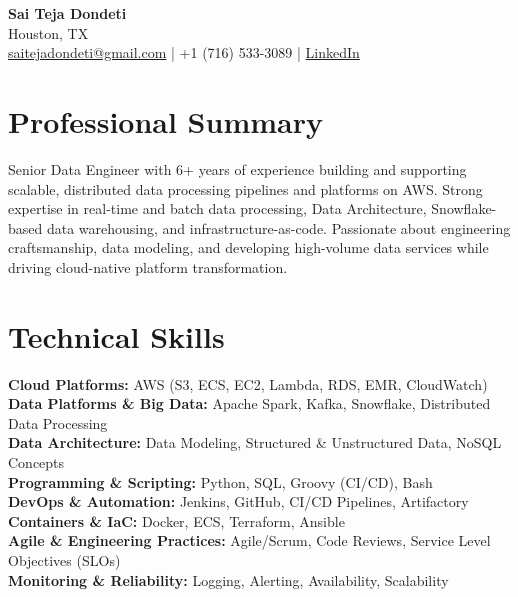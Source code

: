 \documentclass[10pt]{article}
\begin{document}
\begin{center}
    {\LARGE \textbf{Sai Teja Dondeti}} \\
    \vspace{2pt}
    Houston, TX \\
    \href{mailto:saitejadondeti@gmail.com}{saitejadondeti@gmail.com} \;|\;
    +1 (716) 533-3089 \;|\;
    \href{https://www.linkedin.com/in/sai-teja-dondeti/}{LinkedIn}
\end{center}

\section*{Professional Summary}
Senior Data Engineer with 6+ years of experience building and supporting scalable, distributed data processing pipelines and platforms on AWS. Strong expertise in real-time and batch data processing, Data Architecture, Snowflake-based data warehousing, and infrastructure-as-code. Passionate about engineering craftsmanship, data modeling, and developing high-volume data services while driving cloud-native platform transformation.

\section*{Technical Skills}

\textbf{Cloud Platforms:} AWS (S3, ECS, EC2, Lambda, RDS, EMR, CloudWatch) \\
\textbf{Data Platforms \& Big Data:} Apache Spark, Kafka, Snowflake, Distributed Data Processing \\
\textbf{Data Architecture:} Data Modeling, Structured \& Unstructured Data, NoSQL Concepts \\
\textbf{Programming \& Scripting:} Python, SQL, Groovy (CI/CD), Bash \\
\textbf{DevOps \& Automation:} Jenkins, GitHub, CI/CD Pipelines, Artifactory \\
\textbf{Containers \& IaC:} Docker, ECS, Terraform, Ansible \\
\textbf{Agile \& Engineering Practices:} Agile/Scrum, Code Reviews, Service Level Objectives (SLOs) \\
\textbf{Monitoring \& Reliability:} Logging, Alerting, Availability, Scalability

\end{document}
